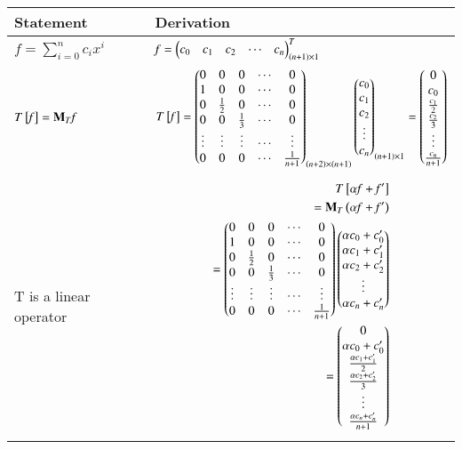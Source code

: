 \documentclass[journal,12pt,twocolumn]{IEEEtran}
\numberwithin{table}{section}
\begin{document}
\renewcommand{\thetable}{2}
\begin{table*}[ht!]
\begin{center}
\begin{tabular}{|l|l|}
\hline
\textbf{Statement} & \textbf{Derivation} \\[0.5ex]
\hline
$\mathit{f}=\sum \limits_{i=0}^n c_i x^i$ & $\mathit{f}=\begin{pmatrix}c_0&c_1&c_2&\cdots&c_n\end{pmatrix}^T_{\left(n+1\right)\times1}$
\\ [0.5ex] 
\hline
$T{}\left[\mathit{f}\right]=\mathbf{M}_T\mathit{f}$ & $T{}\left[\mathit{f}\right]=
\begin{pmatrix}0&0&0&\cdots&0\\1&0&0&\cdots&0\\0&\frac{1}{2}&0&\cdots&0\\0&0&\frac{1}{3}&\cdots&0\\\vdots&\vdots&\vdots&\cdots&\vdots\\0&0&0&\cdots&\frac{1}{n+1}\end{pmatrix}_{\left(n+2\right)\times\left(n+1\right)}
\begin{pmatrix}c_0\\c_1\\c_2\\\vdots\\c_n\end{pmatrix}_{\left(n+1\right)\times1}
=\begin{pmatrix}0\\c_0\\\frac{c_1}{2}\\\frac{c_2}{3}\\\vdots\\\frac{c_n}{n+1}\end{pmatrix}$
\\ [0.5ex] 
\hline
T is a linear operator & 
\parbox{10cm}{\begin{align}
T\sbrak{\alpha\mathit{f}+\mathit{f^\prime}}\\
=\vec{M}_T\brak{\alpha\mathit{f}+\mathit{f^\prime}}\\
=\myvec{0&0&0&\cdots&0\\1&0&0&\cdots&0\\0&\frac{1}{2}&0&\cdots&0\\0&0&\frac{1}{3}&\cdots&0\\\vdots&\vdots&\vdots&\cdots&\vdots\\0&0&0&\cdots&\frac{1}{n+1}}
\myvec{\alpha c_0+c_0^\prime\\\alpha c_1+c_1^\prime\\\alpha c_2+c_2^\prime\\\vdots\\\alpha c_n+c_n^\prime}\\
=\myvec{0\\\alpha c_0+c_0^\prime\\\frac{\alpha c_1+c_1^\prime}{2}\\\frac{\alpha c_2+c_2^\prime}{3}\\\vdots\\\frac{\alpha c_n+c_n^\prime}{n+1}}

\end{align}}
\end{tabular}
\end{center}
\end{table*}
\end{document}
